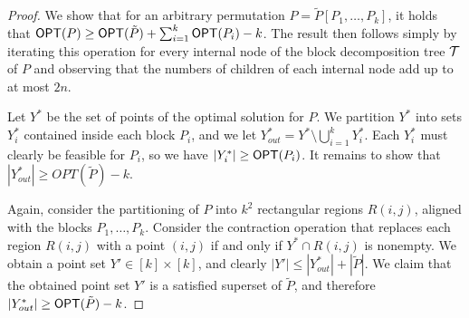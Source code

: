 \begin{proof} 

We show that for an arbitrary permutation $P = \tilde{P}[P_1,\dots,P_k]$, it holds that $\mbox{\sf OPT}(P) \geq \mbox{\sf OPT}(\tilde{P}) + \sum_{i=1}^k{\mbox{\sf OPT}(P_i)} - k$. The result then follows simply by iterating this operation for every internal node of the block decomposition tree ${\mathcal T}$ of $P$ and observing that the numbers of children of each internal node add up to at most $2n$. %

Let $Y^*$ be the set of points of the optimal solution for $P$. We partition $Y^*$ into sets $Y^*_i$ contained inside each block $P_i$, and we let $Y^*_{out} = Y^* \setminus \bigcup_{i=1}^k{Y^*_i}$. Each $Y^*_i$ must clearly be feasible for $P_i$, so we have $|Y^*_i| \geq \mbox{\sf OPT}(P_i)$. It remains to show that $|Y^*_{out}| \geq OPT(\tilde{P}) - k$. 



Again, consider the partitioning of $P$ into $k^2$ rectangular regions $R(i,j)$, aligned with the blocks $P_1, \dots, P_k$. Consider the contraction operation that replaces each region $R(i,j)$ with a point $(i,j)$ if and only if $Y^* \cap R(i,j)$ is nonempty. We obtain a point set $Y' \in [k] \times [k]$, and clearly $|Y'| \leq |Y^*_{out}| + |\tilde{P}|$. We claim that the obtained point set $Y'$ is a satisfied superset of $\tilde{P}$, and therefore $|Y^*_{out}| \geq \mbox{\sf OPT}(\tilde{P}) - k$. 


\end{proof}

